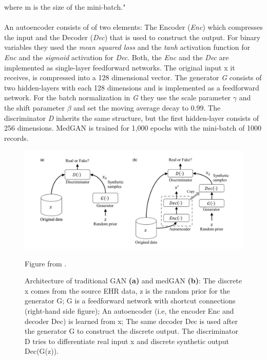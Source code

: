 \documentclass[11pt, a4paper]{book}
\begin{document}
where m is the size of the mini-batch." \cite{Choi2017}
\\
\\
An autoencoder consists of of two elements: The Encoder (\textit{Enc}) which compresses the input and the Decoder (\textit{Dec}) that is used to construct the output.
For binary variables they used the \textit{mean squared loss} and the \textit{tanh} activation function for \textit{Enc} and the \textit{sigmoid} activation for \textit{Dec}.
Both, the \textit{Enc} and the \textit{Dec} are implemented as single-layer feedforward networks. The original input x it receives, is compressed into a 128 dimensional vector. The generator \textit{G} consists of two hidden-layers with each 128 dimensions and is implemented as a feedforward network. For the batch normalization in \textit{G} they use the scale parameter  $\gamma$ and the shift parameter $\beta$ and set the moving average decay to 0.99. The discriminator \textit{D} inherits the same structure, but the first hidden-layer consists of 256 dimensions. MedGAN is trained for 1,000 epochs with the mini-batch of 1000 records. \cite{Choi2017}
\begin{figure}
  \begin{center}
  \includegraphics[width=1\textwidth]{img/ganVSmedgan.png}
  \caption{Architecture of traditional GAN \textbf{(a)} and medGAN \textbf{(b)}: The discrete x comes from the source EHR data, z is the random prior for the generator G; G is a feedforward network with shortcut connections (right-hand side figure); An autoencoder (i.e, the encoder Enc and decoder Dec) is learned from x; The same decoder Dec is used after the generator G to construct the discrete output. The discriminator D tries to differentiate real input x and discrete synthetic output Dec(G(z)).  \cite{Choi2017}} Figure from \cite{Baowaly2018}.
  \label{fig:medgan-architecture}
  \end{center}
\end{figure}
\end{document}
